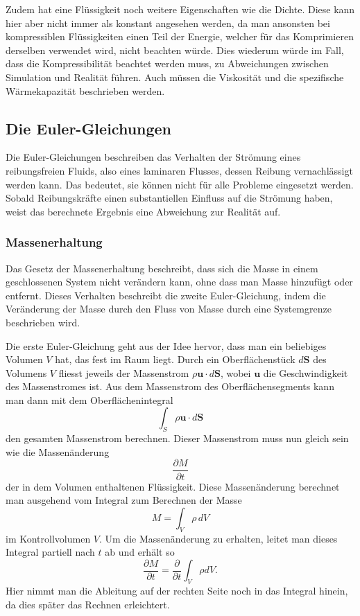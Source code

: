 Zudem hat eine Flüssigkeit noch weitere Eigenschaften wie die Dichte. 
Diese kann hier aber nicht immer als konstant angesehen werden, da man ansonsten bei kompressiblen Flüssigkeiten einen Teil der Energie, welcher für das Komprimieren derselben verwendet wird, nicht beachten würde.
%
Dies wiederum würde im Fall, dass die Kompressibilität beachtet werden muss, zu Abweichungen zwischen Simulation und Realität führen.
Auch müssen die Viskosität und die spezifische Wärmekapazität beschrieben werden.
%
%

\subsection{Die Euler-Gleichungen}
Die Euler-Gleichungen beschreiben das Verhalten der Strömung eines reibungsfreien Fluids, also eines laminaren Flusses, dessen Reibung vernachlässigt werden kann. 
%
Das bedeutet, sie können nicht für alle Probleme eingesetzt werden. 
Sobald Reibungskräfte einen substantiellen Einfluss auf die Strömung haben, weist das berechnete Ergebnis eine Abweichung zur Realität auf.

\subsubsection{Massenerhaltung}
Das Gesetz der Massenerhaltung beschreibt, dass sich die Masse in einem geschlossenen System nicht verändern kann, ohne dass man Masse hinzufügt oder entfernt. 
%
Dieses Verhalten beschreibt die zweite Euler-Gleichung, indem die Veränderung der Masse durch den Fluss von Masse durch eine Systemgrenze beschrieben wird.

Die erste Euler-Gleichung geht aus der Idee hervor, dass man ein beliebiges Volumen $V$ hat, das fest im Raum liegt. Durch ein Oberflächenstück 
$d \mathbf{S} $ 
des Volumens 
$V$
 fliesst jeweils der Massenstrom 
$ \rho\mathbf{u}\cdot d\mathbf{S}$, wobei $\mathbf{u}$ die Geschwindigkeit des Massenstromes ist.
Aus dem Massenstrom des Oberflächensegments kann man dann mit dem Oberflächenintegral 
\[\int_{S}\rho\mathbf{u}\cdot d\mathbf{S}\]
den gesamten Massenstrom berechnen. Dieser Massenstrom muss nun gleich sein wie die Massenänderung 
\[\frac{\partial M}{\partial t}\]
der in dem Volumen enthaltenen Flüssigkeit.
Diese Massenänderung berechnet man ausgehend vom Integral zum Berechnen der Masse 
\[M 
= 
\int_{V} \rho \, dV\]
im Kontrollvolumen $V.$
Um die Massenänderung zu erhalten, leitet man dieses Integral partiell nach $t$ ab und erhält so
\[\frac{\partial M}{\partial t}
=
\frac{\partial }{\partial t} \int_{V}\rho dV.\]
Hier nimmt man die Ableitung auf der rechten Seite noch in das Integral hinein, da dies später das Rechnen erleichtert.

